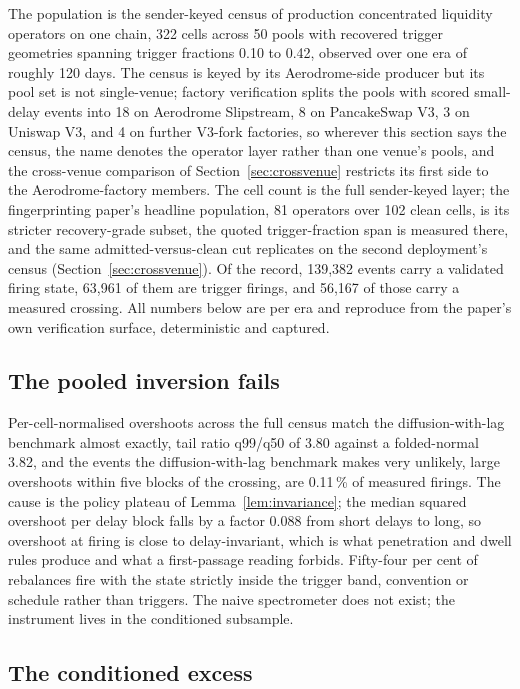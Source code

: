 \documentclass[11pt,a4paper]{article}
\theoremstyle{definition}
\theoremstyle{plain}
\theoremstyle{remark}
\begin{document}
The population is the sender-keyed census of production concentrated liquidity operators on one chain, 322 cells across 50 pools with recovered trigger geometries spanning trigger 
fractions 0.10 to 0.42,\cite{ryan2026fingerprint} observed over one era of roughly 120 days. The census is keyed by its Aerodrome-side producer but its pool set is not single-venue; 
factory verification splits the pools with scored small-delay events into 18 on Aerodrome Slipstream, 8 on PancakeSwap V3, 3 on Uniswap V3, and 4 on further V3-fork factories, so 
wherever this section says the census, the name denotes the operator layer rather than one venue's pools, and the cross-venue comparison of Section~\ref{sec:crossvenue} restricts 
its first side to the Aerodrome-factory members. The cell count is the full sender-keyed layer; the fingerprinting paper's headline population, 81 operators over 102 clean cells, 
is its stricter recovery-grade subset, the quoted trigger-fraction span is measured there, and the same admitted-versus-clean cut replicates on the second deployment's 
census (Section~\ref{sec:crossvenue}). Of the record, 139{,}382 events carry a validated firing state, 63{,}961 of them are trigger firings, and 56{,}167 of those carry a 
measured crossing. All numbers below are per era and reproduce from the paper's own verification surface, deterministic and captured.

\subsection{The pooled inversion fails}\label{sec:pooledfail}

Per-cell-normalised overshoots across the full census match the diffusion-with-lag benchmark almost exactly, tail ratio q99/q50 of 3.80 against a folded-normal 3.82, and the 
events the diffusion-with-lag benchmark makes very unlikely, large overshoots within five blocks of the crossing, are 0.11\,\% of measured firings. The cause is the policy plateau 
of Lemma~\ref{lem:invariance}; the median squared overshoot per delay block falls by a factor 0.088 from short delays to long, so overshoot at firing is close to delay-invariant, 
which is what penetration and dwell rules produce and what a first-passage reading forbids. Fifty-four per cent of rebalances fire with the state strictly inside the trigger band, 
convention or schedule rather than triggers. The naive spectrometer does not exist; the instrument lives in the conditioned subsample.

\subsection{The conditioned excess}\label{sec:conditioned}
\end{document}
